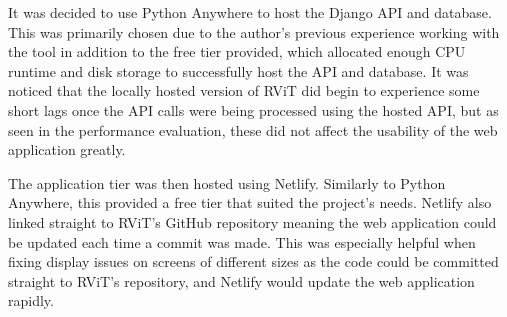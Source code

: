 \documentclass[l4proj.tex]{subfiles}
\begin{document}
It was decided to use Python Anywhere to host the Django API and database. This was primarily chosen due to the author's previous experience working with the tool in addition to the free tier provided, which allocated enough CPU runtime and disk storage to successfully host the API and database. It was noticed that the locally hosted version of RViT did begin to experience some short lags once the API calls were being processed using the hosted API, but as seen in the performance evaluation, these did not affect the usability of the web application greatly.

The application tier was then hosted using Netlify. Similarly to Python Anywhere, this provided a free tier that suited the project's needs. Netlify also linked straight to RViT's GitHub repository meaning the web application could be updated each time a commit was made. This was especially helpful when fixing display issues on screens of different sizes as the code could be committed straight to RViT's repository, and Netlify would update the web application rapidly.
\end{document}
